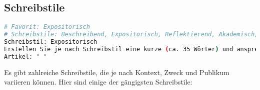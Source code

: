 \documentclass[12pt,a4paper]{scrartcl}
\begin{document}
\hypertarget{schreibstile-1}{%
\subsection{Schreibstile}\label{schreibstile-1}}

\begin{lstlisting}[language=bash]
# Favorit: Expositorisch
# Schreibstile: Beschreibend, Expositorisch, Reflektierend, Akademisch, Kritisch
Schreibstil: Expositorisch
Erstellen Sie je nach Schreibstil eine kurze (ca. 35 Wörter) und ansprechende Zusammenfassung des folgenden Artikels. Die Zusammenfassung sollte für jemanden ohne wissenschaftlichen Hintergrund verständlich sein und gleichzeitig die wichtigsten Informationen genau wiedergeben. 
Artikel: " "
\end{lstlisting}

Es gibt zahlreiche Schreibstile, die je nach Kontext, Zweck und Publikum
variieren können. Hier sind einige der gängigsten Schreibstile:
\end{document}
